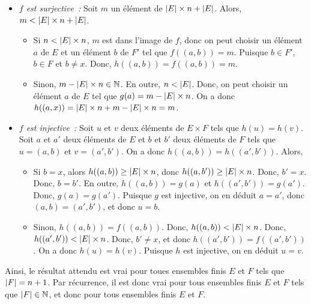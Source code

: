 \begin{itemize}[nosep]
    \item \textit{$f$ est surjective :}
        Soit $m$ un élément de $\left\lvert E \right\rvert \times n + \left\lvert E \right\rvert$.
        Alors, $m < \left\lvert E \right\rvert \times n + \left\lvert E \right\rvert$. 
        \begin{itemize}[nosep]
            \item Si $n < \left\lvert E \right\rvert \times n$, $m$ est dans l'image de $f$, donc on peut choisir un élément $a$ de $E$ et un élément $b$ de $F'$ tel que $f((a,b)) = m$. 
                Puisque $b \in F'$, $b \in F$ et $b \neq x$.
                Donc, $h((a,b)) = f((a,b)) = m$.
            \item Sinon, $m - \left\lvert E \right\rvert \times n \in \mathbb{N}$. 
                En outre, $n < \left\lvert E \right\rvert$.
                Donc, on peut choisir un élément $a$ de $E$ tel que $g(a) = m - \left\lvert E \right\rvert \times n$.
                On a donc $h((a,x)) = \left\lvert E \right\rvert \times n + m - \left\lvert E \right\rvert \times n = m$.
        \end{itemize}
    \item \textit{$f$ est injective :} Soit $u$ et $v$ deux éléments de $E \times F$ tels que $h(u) = h(v)$. 
        Soit $a$ et $a'$ deux éléments de $E$ et $b$ et $b'$ deux éléments de $F$ tels que $u = (a,b)$ et $v = (a',b')$.
        On a donc $h((a,b)) = h((a',b'))$.
        Alors, 
        \begin{itemize}[nosep]
            \item Si $b = x$, alors $h((a,b)) \geq \left\lvert E \right\rvert \times n$, donc $h((a,b')) \geq \left\lvert E \right\rvert \times n$.
                Donc, $b' = x$.
                Donc, $b = b'$.
                En outre, $h((a,b)) = g(a)$ et $h((a',b')) = g(a')$.
                Donc, $g(a) = g(a')$.
                Puisque $g$ est injective, on en déduit $a = a'$, donc $(a,b) = (a',b')$, et donc $u = b$.
            \item Sinon, $h((a,b)) = f((a,b))$. 
                Donc, $h((a,b)) < \left\lvert E \right\rvert \times n$.
                Donc, $h((a',b')) < \left\lvert E \right\rvert \times n$.
                Donc, $b' \neq x$, et donc $h((a',b')) = f((a',b'))$.
                On a donc $h(u) = h(v)$.
                Puisque $h$ est injective, on en déduit $u = v$.
        \end{itemize}
\end{itemize}

Ainsi, le résultat attendu est vrai pour toues ensembles finis $E$ et $F$ tels que $\left\lvert F \right\rvert= n+1$. 
Par récurrence, il est donc vrai pour tous ensembles finis $E$ et $F$ tels que $\left\lvert F \right\rvert \in \mathbb{N}$, et donc pour tous ensembles finis $E$ et $F$.

